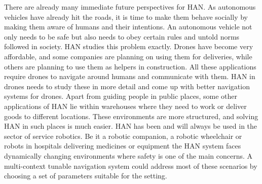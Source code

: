 There are already many immediate future perspectives for HAN. As autonomous vehicles have already hit the roads, it is time to make them behave socially by making them aware of humans and their intentions. An autonomous vehicle not only needs to be safe but also needs to obey certain rules and untold norms followed in society. HAN studies this problem exactly. Drones have become very affordable, and some companies are planning on using them for deliveries, while others are planning to use them as helpers in construction. All these applications require drones to navigate around humans and communicate with them. HAN in drones needs to study these in more detail and come up with better navigation systems for drones. Apart from guiding people in public places, some other applications of HAN  lie within warehouses where they need to work or deliver goods to different locations. These environments are more structured, and solving HAN in such places is much easier. HAN has been and will always be used in the sector of service robotics. Be it a robotic companion, a robotic wheelchair or robots in hospitals delivering medicines or equipment the HAN system faces dynamically changing environments where safety is one of the main concerns. A multi-context tunable navigation system could address most of these scenarios by choosing a set of parameters suitable for the setting.

